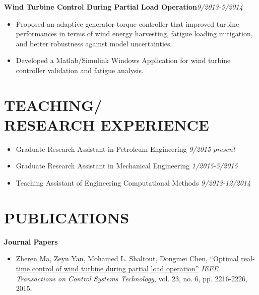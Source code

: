 \documentclass[margin, 9pt]{res} %
\begin{document}
\begin{resume}
\medskip
{\textbf{Wind Turbine Control During Partial Load Operation}}\hfill\textit{9/2013-5/2014}\\
\vspace*{-10pt}
\begin{itemize}[leftmargin=*] \itemsep -3pt
\vspace*{-5pt}
	\item Proposed an adaptive generator torque controller that  improved turbine performances in terms of wind energy harvesting, fatigue loading mitigation, and better robustness against model uncertainties.
    \item Developed a Matlab/Simulink Windows Application for wind turbine controller validation and fatigue analysis.
\end{itemize}


\section{TEACHING/\\RESEARCH EXPERIENCE}
\begin{itemize}[leftmargin=*] \itemsep -2pt
\vspace*{-2pt}
	\item Graduate Research Assistant in Petroleum Engineering \hfill\textit{9/2015-present}
	\item Graduate Research Assistant in Mechanical Engineering \hfill\textit{1/2015-5/2015}
	\item Teaching Assistant of Engineering Computational Methods \hfill\textit{9/2013-12/2014}
\end{itemize}


\section{PUBLICATIONS}

{\large\textbf{Journal Papers}}
\begin{itemize}[leftmargin=*] \itemsep 0pt
	\item \underline{Zheren Ma}, Zeyu Yan, Mohamed L. Shaltout, Dongmei Chen, 
          \href{http://ieeexplore.ieee.org/xpl/login.jsp?tp=&arnumber=7065260&url=http\%3A\%2F\%2Fieeexplore.ieee.org\%2Fxpls\%2Fabs_all.jsp\%3Farnumber\%3D7065260}
          {``Optimal real-time control of wind turbine during partial load operation''}
          \textit{IEEE Transactions on Control Systems Technology}, vol. 23, no. 6, pp. 2216-2226, 2015.


\end{itemize}
\end{resume}
\end{document}

